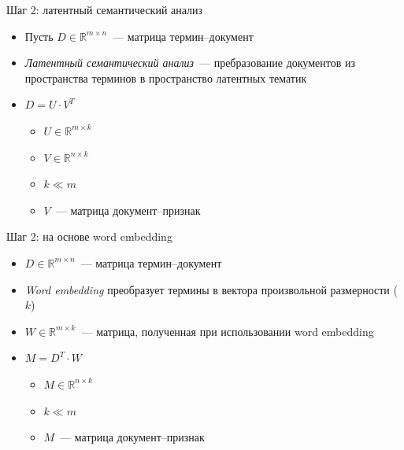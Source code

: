 \documentclass{beamer}
\begin{document}
\begin{frame}{Шаг 2: латентный семантический анализ}
  \begin{itemize}
      \item {Пусть $D \in \mathbb{R}^{m \times n}$~--- матрица термин--документ}
      \item {\textit{Латентный семантический анализ}~--- пребразование документов из пространства
             терминов в пространство латентных тематик}
      \item {$D = U \cdot V^{T}$}
      \begin{itemize}
          \item {$U \in \mathbb{R}^{m \times k}$}
          \item {$V \in \mathbb{R}^{n \times k}$}
          \item {$k \ll m$}
          \item {$V$~--- матрица документ--признак}
      \end{itemize}
  \end{itemize}
\end{frame}

\begin{frame}{Шаг 2: на основе word embedding}
  \begin{itemize}
      \item {$D \in \mathbb{R}^{m \times n}$~--- матрица термин--документ}
      \item {\textit{Word embedding} преобразует термины в вектора произвольной размерности ($k$)}
      \item {$W \in \mathbb{R}^{m \times k}$~--- матрица, полученная при использовании word embedding}
      \item {$M = D^T \cdot W$}
      \begin{itemize}
          \item {$M \in \mathbb{R}^{n \times k}$}
          \item {$k \ll m$}
          \item {$M$~--- матрица документ--признак}
      \end{itemize}
  \end{itemize}
\end{frame}
\end{document}
